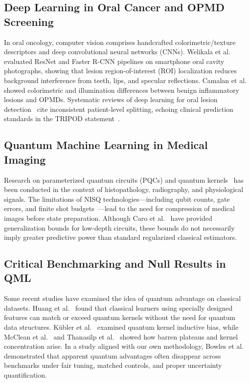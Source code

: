 \documentclass[conference]{IEEEtran}
\begin{document}
\subsection{Deep Learning in Oral Cancer and OPMD Screening}
In oral oncology, computer vision comprises handcrafted colorimetric/texture descriptors and deep convolutional neural networks (CNNs). Welikala et al.~\cite{welikala2020automated} evaluated ResNet and Faster R-CNN pipelines on smartphone oral cavity photographs, showing that lesion region-of-interest (ROI) localization reduces background interference from teeth, lips, and specular reflections. Camalan et al.~\cite{camalan2021convolutional} showed colorimetric and illumination differences between benign inflammatory lesions and OPMDs. Systematic reviews of deep learning for oral lesion detection~\cite{warin2022deep} cite inconsistent patient-level splitting, echoing clinical prediction standards in the TRIPOD statement~\cite{collins2015transparent}.

\subsection{Quantum Machine Learning in Medical Imaging}
Research on parameterized quantum circuits (PQCs) and quantum kernels~\cite{schuld2019quantum, cerezo2021variational, havlicek2019supervised} has been conducted in the context of histopathology, radiography, and physiological signals. The limitations of NISQ technologies---including qubit counts, gate errors, and finite shot budgets~\cite{bharti2022noisy, preskill2018quantum}---lead to the need for compression of medical images before state preparation. Although Caro et al.~\cite{caro2022generalization} have provided generalization bounds for low-depth circuits, these bounds do not necessarily imply greater predictive power than standard regularized classical estimators.

\subsection{Critical Benchmarking and Null Results in QML}
Some recent studies have examined the idea of quantum advantage on classical datasets. Huang et al.~\cite{huang2021power} found that classical learners using specially designed features can match or exceed quantum kernels without the need for quantum data structures. K{\"u}bler et al.~\cite{kubler2021inductive} examined quantum kernel inductive bias, while McClean et al.~\cite{mcclean2018barren} and Thanasilp et al.~\cite{thanasilp2022subtleties} showed how barren plateaus and kernel concentration arise. In a study aligned with our own methodology, Bowles et al.~\cite{bowles2024better} demonstrated that apparent quantum advantages often disappear across benchmarks under fair tuning, matched controls, and proper uncertainty quantification.
\end{document}
